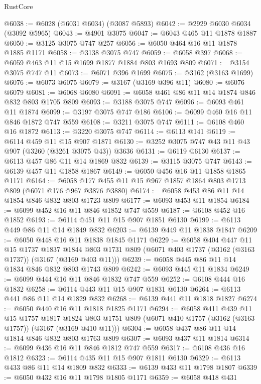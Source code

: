 \begin{lexlean}{RustCore}
\begin{coremodule}
@6038 := @6028 (@6031 @6034) (@3087 @5893)
@6042 := @2929 @6030 @6034 (@3092 @5965)
@6043 := @4901 @3075
@6047 := @6043 @465 @11 @1878 @1887
@6050 := @3125 @3075 @747 @257
@6056 := @6050 @464 @16 @11 @1878 @1885 @1171
@6058 := @3138 @3075 @747
@6059 := @6058 @397
@6068 := @6059 @463 @11 @15 @1699 @1877 @1884 @803 @1693 @809
@6071 := @3154 @3075 @747 @11
@6073 := @6071 @396 @1699
@6075 := @3162 (@3163 @1699)
@6076 := @6073 @6075
@6079 := @3167 (@3169 @396 @11)
@6080 := @6076 @6079
@6081 := @6068 @6080
@6091 := @6058 @461 @86 @11 @14 @1874 @846 @832 @803 @1705 @809
@6093 := @3188 @3075 @747
@6096 := @6093 @461 @11 @1874
@6099 := @3197 @3075 @747 @186
@6106 := @6099 @460 @16 @11 @846 @1872 @747 @559
@6108 := @3211 @3075 @747
@6111 := @6108 @460 @16 @1872
@6113 := @3220 @3075 @747
@6114 := @6113 @141
@6119 := @6114 @459 @11 @15 @907 @1871
@6130 := @3252 @3075 @747 @43 @11 @43 @907 (@3260 (@3261 @3075 @43)) @3636
@6131 := @6119 @6130
@6137 := @6113 @457 @86 @11 @14 @1869 @832
@6139 := @3115 @3075 @747
@6143 := @6139 @457 @11 @1858 @1867
@6149 := @6050 @456 @16 @11 @1858 @1865 @1171
@6164 := @6058 @177 @455 @11 @15 @967 @1857 @1864 @803 @1713 @809 (@6071 @176 @967 @3876 @3880)
@6174 := @6058 @453 @86 @11 @14 @1854 @846 @832 @803 @1723 @809
@6177 := @6093 @453 @11 @1854
@6184 := @6099 @452 @16 @11 @846 @1852 @747 @559
@6187 := @6108 @452 @16 @1852
@6193 := @6114 @451 @11 @15 @907 @1851 @6130
@6199 := @6113 @449 @86 @11 @14 @1849 @832
@6203 := @6139 @449 @11 @1838 @1847
@6209 := @6050 @448 @16 @11 @1838 @1845 @1171
@6229 := @6058
    @404
    @447
    @11
    @15
    @1737
    @1837
    @1844
    @803
    @1731
    @809
    (@6071 @403 @1737 (@3162 (@3163 @1737)) (@3167 (@3169 @403 @11)))
@6239 := @6058 @445 @86 @11 @14 @1834 @846 @832 @803 @1743 @809
@6242 := @6093 @445 @11 @1834
@6249 := @6099 @444 @16 @11 @846 @1832 @747 @559
@6252 := @6108 @444 @16 @1832
@6258 := @6114 @443 @11 @15 @907 @1831 @6130
@6264 := @6113 @441 @86 @11 @14 @1829 @832
@6268 := @6139 @441 @11 @1818 @1827
@6274 := @6050 @440 @16 @11 @1818 @1825 @1171
@6294 := @6058
    @411
    @439
    @11
    @15
    @1757
    @1817
    @1824
    @803
    @1751
    @809
    (@6071 @410 @1757 (@3162 (@3163 @1757)) (@3167 (@3169 @410 @11)))
@6304 := @6058 @437 @86 @11 @14 @1814 @846 @832 @803 @1763 @809
@6307 := @6093 @437 @11 @1814
@6314 := @6099 @436 @16 @11 @846 @1812 @747 @559
@6317 := @6108 @436 @16 @1812
@6323 := @6114 @435 @11 @15 @907 @1811 @6130
@6329 := @6113 @433 @86 @11 @14 @1809 @832
@6333 := @6139 @433 @11 @1798 @1807
@6339 := @6050 @432 @16 @11 @1798 @1805 @1171
@6359 := @6058
    @418
    @431

\end{coremodule}
\end{lexlean}
